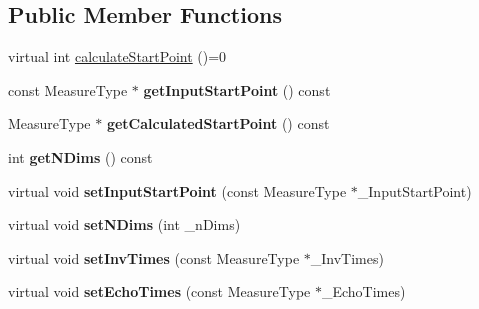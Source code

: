 \subsection*{Public Member Functions}
\begin{DoxyCompactItemize}
\item 
virtual int \hyperlink{class_ox_1_1_start_point_calculator_a9d1132410d68eb16f3f71ec4015c0b2f}{calculate\-Start\-Point} ()=0
\item 
\hypertarget{class_ox_1_1_start_point_calculator_a01bcfb382bec0c4c28ae2bb5783b458c}{const Measure\-Type $\ast$ {\bfseries get\-Input\-Start\-Point} () const }\label{class_ox_1_1_start_point_calculator_a01bcfb382bec0c4c28ae2bb5783b458c}

\item 
\hypertarget{class_ox_1_1_start_point_calculator_a48b39c1d6bb733821f7297593e424728}{Measure\-Type $\ast$ {\bfseries get\-Calculated\-Start\-Point} () const }\label{class_ox_1_1_start_point_calculator_a48b39c1d6bb733821f7297593e424728}

\item 
\hypertarget{class_ox_1_1_start_point_calculator_a75c73487e21a0f4920762c1efc96d573}{int {\bfseries get\-N\-Dims} () const }\label{class_ox_1_1_start_point_calculator_a75c73487e21a0f4920762c1efc96d573}

\item 
\hypertarget{class_ox_1_1_start_point_calculator_ac76047ce4b0d474203cae066471cce61}{virtual void {\bfseries set\-Input\-Start\-Point} (const Measure\-Type $\ast$\-\_\-\-Input\-Start\-Point)}\label{class_ox_1_1_start_point_calculator_ac76047ce4b0d474203cae066471cce61}

\item 
\hypertarget{class_ox_1_1_start_point_calculator_a02b51af6d6019cfc47d04b752ad96c86}{virtual void {\bfseries set\-N\-Dims} (int \-\_\-n\-Dims)}\label{class_ox_1_1_start_point_calculator_a02b51af6d6019cfc47d04b752ad96c86}

\item 
\hypertarget{class_ox_1_1_start_point_calculator_a0632bd0dcf7707930058d63e2176fc7a}{virtual void {\bfseries set\-Inv\-Times} (const Measure\-Type $\ast$\-\_\-\-Inv\-Times)}\label{class_ox_1_1_start_point_calculator_a0632bd0dcf7707930058d63e2176fc7a}

\item 
\hypertarget{class_ox_1_1_start_point_calculator_ab49fe45a4ee7b415edd0948c9fc76fbb}{virtual void {\bfseries set\-Echo\-Times} (const Measure\-Type $\ast$\-\_\-\-Echo\-Times)}\label{class_ox_1_1_start_point_calculator_ab49fe45a4ee7b415edd0948c9fc76fbb}


\end{DoxyCompactItemize}
